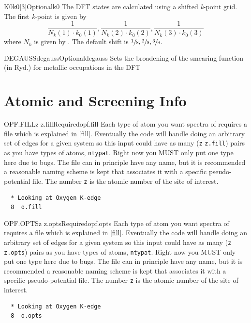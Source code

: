 \documentclass[11pt]{report}
\begin{document}
\begin{Card}{K0}{k0[3]}{Optional}{k0}
The DFT states are calculated using a shifted {\it k}-point grid. 
The first {\it k}-point is given by 
\begin{equation}
\frac{1}{N_k(1) \cdot k_0(1)}, \frac{1}{N_k(2) \cdot k_0(2)}, \frac{1}{N_k(3) \cdot k_0(3)} \nonumber
\end{equation}
where $N_k$ is given by .
The default shift is $\sfrac{1}{8},\sfrac{2}{8},\sfrac{3}{8}$.
\end{Card}

\begin{Card}{DEGAUSS}{degauss}{Optional}{degauss}
Sets the broadening of the smearing function (in Ryd.) for metallic occupations in the DFT
\end{Card}

\section{Atomic and Screening Info}
\label{sec:AS-Info}

\begin{Card}{OPF.FILL}{z z.fill}{Required}{opf.fill}
Each type of atom you want spectra of requires a  file which is explained in \ref{fill}. Eventually the code will handle doing an arbitrary set of edges for a given system so this input could have as many (\texttt{z} \texttt{z.fill}) pairs as you have types of atoms, \texttt{ntypat}. Right now you MUST only put one type here due to bugs. The file  can in principle have any name, but it is recommended a reasonable naming scheme is kept that associates it with a specific pseudo-potential file. The number \texttt{z} is the atomic number of the site of interest.

\begin{verbatim}
  * Looking at Oxygen K-edge
  8  o.fill
\end{verbatim}
\end{Card}

\begin{Card}{OPF.OPTS}{z z.opts}{Required}{opf.opts}
Each type of atom you want spectra of requires a  file which is explained in \ref{fill}. Eventually the code will handle doing an arbitrary set of edges for a given system so this input could have as many (\texttt{z} \texttt{z.opts}) pairs as you have types of atoms, \texttt{ntypat}. Right now you MUST only put one type here due to bugs. The file  can in principle have any name, but it is recommended a reasonable naming scheme is kept that associates it with a specific pseudo-potential file. The number \texttt{z} is the atomic number of the site of interest.

\begin{verbatim}
  * Looking at Oxygen K-edge
  8  o.opts
\end{verbatim}
\end{Card}
\end{document}
